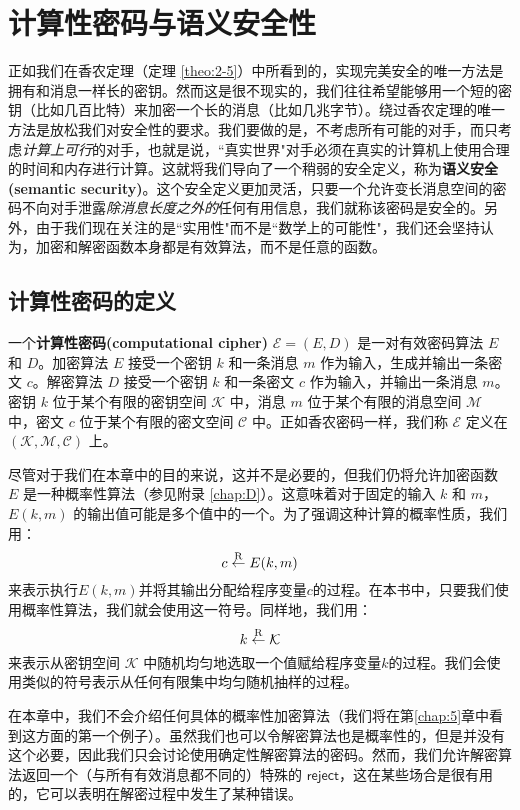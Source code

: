 \section{计算性密码与语义安全性}

正如我们在香农定理（定理 \ref{theo:2-5}）中所看到的，实现完美安全的唯一方法是拥有和消息一样长的密钥。然而这是很不现实的，我们往往希望能够用一个短的密钥（比如几百比特）来加密一个长的消息（比如几兆字节）。绕过香农定理的唯一方法是放松我们对安全性的要求。我们要做的是，不考虑所有可能的对手，而只考虑\emph{计算上可行}的对手，也就是说，``真实世界"对手必须在真实的计算机上使用合理的时间和内存进行计算。这就将我们导向了一个稍弱的安全定义，称为\textbf{语义安全(semantic security)}。这个安全定义更加灵活，只要一个允许变长消息空间的密码不向对手泄露\emph{除消息长度之外的}任何有用信息，我们就称该密码是安全的。另外，由于我们现在关注的是``实用性"而不是``数学上的可能性"，我们还会坚持认为，加密和解密函数本身都是有效算法，而不是任意的函数。

\subsection{计算性密码的定义}\label{subsec:2-2-1}

一个\textbf{计算性密码(computational cipher)} $\mathcal{E}=(E,D)$ 是一对有效密码算法 $E$ 和 $D$。加密算法 $E$ 接受一个密钥 $k$ 和一条消息 $m$ 作为输入，生成并输出一条密文 $c$。解密算法 $D$ 接受一个密钥 $k$ 和一条密文 $c$ 作为输入，并输出一条消息 $m$。密钥 $k$ 位于某个有限的密钥空间 $\mathcal{K}$ 中，消息 $m$ 位于某个有限的消息空间 $\mathcal{M}$ 中，密文 $c$ 位于某个有限的密文空间 $\mathcal{C}$ 中。正如香农密码一样，我们称 $\mathcal{E}$ 定义在 $(\mathcal{K},\mathcal{M},\mathcal{C})$ 上。

尽管对于我们在本章中的目的来说，这并不是必要的，但我们仍将允许加密函数 $E$ 是一种概率性算法（参见附录 \ref{chap:D}）。这意味着对于固定的输入 $k$ 和 $m$，$E(k,m)$ 的输出值可能是多个值中的一个。为了强调这种计算的概率性质，我们用：
\[
c\overset{\rm R}\leftarrow E(k,m)
\]
来表示执行$E(k,m)$并将其输出分配给程序变量$c$的过程。在本书中，只要我们使用概率性算法，我们就会使用这一符号。同样地，我们用：
\[
k\overset{\rm R}\leftarrow\mathcal{K}
\]
来表示从密钥空间 $\mathcal{K}$ 中随机均匀地选取一个值赋给程序变量$k$的过程。我们会使用类似的符号表示从任何有限集中均匀随机抽样的过程。

在本章中，我们不会介绍任何具体的概率性加密算法（我们将在第\ref{chap:5}章中看到这方面的第一个例子）。虽然我们也可以令解密算法也是概率性的，但是并没有这个必要，因此我们只会讨论使用确定性解密算法的密码。然而，我们允许解密算法返回一个（与所有有效消息都不同的）特殊的 $\mathsf{reject}$，这在某些场合是很有用的，它可以表明在解密过程中发生了某种错误。

